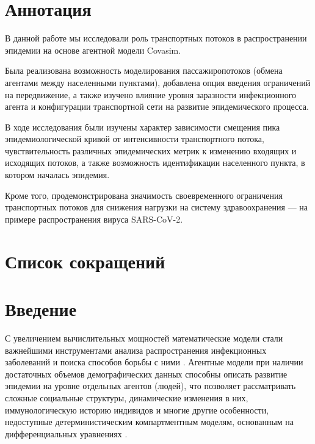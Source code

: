 \documentclass[a4paper,12pt]{article} %
\begin{document}
\setcounter{page}{2}

\section*{Аннотация}
В данной работе мы исследовали роль транспортных потоков в распространении эпидемии на основе агентной модели Covasim.

Была реализована возможность моделирования пассажиропотоков (обмена агентами между населенными пунктами), добавлена опция введения ограничений на передвижение, а также изучено влияние уровня заразности инфекционного агента и конфигурации транспортной сети на развитие эпидемического процесса.

В ходе исследования были изучены характер зависимости смещения пика эпидемиологической кривой от интенсивности транспортного потока, чувствительность различных эпидемических метрик к изменению входящих и исходящих потоков, а также возможность идентификации населенного пункта, в котором началась эпидемия.

Кроме того, продемонстрирована значимость своевременного ограничения транспортных потоков для снижения нагрузки на систему здравоохранения — на примере распространения вируса SARS-CoV-2.


\newpage

\section*{Список сокращений}
\printglossary[type=\acronymtype, title={}]
\newpage

\tableofcontents
\newpage



\section{Введение}
С увеличением вычислительных мощностей математические модели стали важнейшими инструментами анализа распространения инфекционных заболеваний и поиска способов борьбы с ними \cite{hethcote2000mathematics, hethcote1989three, hethcote1992transmission}. Агентные модели при наличии достаточных объемов демографических данных способны описать развитие эпидемии на уровне отдельных агентов (людей), что позволяет рассматривать сложные социальные структуры, динамические изменения в них, иммунологическую историю индивидов и многие другие особенности, недоступные детерминистическим компартментным моделям, основанным на дифференциальных уравнениях \cite{rakowski2010influenza}.
\end{document}
